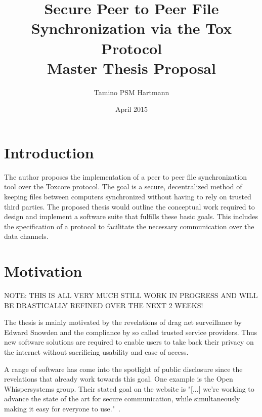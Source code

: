 \documentclass[twoside]{article}
\begin{document}
\title{\textbf{Secure Peer to Peer File Synchronization via the Tox Protocol}\\{\Large Master Thesis Proposal}}
\author{Tamino PSM Hartmann}
\date{April 2015}
\maketitle

\setcounter{secnumdepth}{0}
\pagestyle{headings}

\section{Introduction}

The author proposes the implementation of a peer to peer file synchronization tool over the Toxcore protocol.
The goal is a secure, decentralized method of keeping files between computers synchronized without having to rely on trusted third parties.
The proposed thesis would outline the conceptual work required to design and implement a software suite that fulfills these basic goals.
This includes the specification of a protocol to facilitate the necessary communication over the data channels.

\section{Motivation}

NOTE: THIS IS ALL VERY MUCH STILL WORK IN PROGRESS AND WILL BE DRASTICALLY REFINED OVER THE NEXT 2 WEEKS!


The thesis is mainly motivated by the revelations of drag net surveillance by Edward Snowden and the compliance by so called trusted service providers.
Thus new software solutions are required to enable users to take back their privacy on the internet without sacrificing usability and ease of access.

A range of software has come into the spotlight of public disclosure since the revelations that already work towards this goal.
One example is the Open Whispersystems group.
Their stated goal on the website is "[...] we're working to advance the state of the art for secure communication, while simultaneously making it easy for everyone to use."~\cite{web:site:whispersystems:about}.
\end{document}
